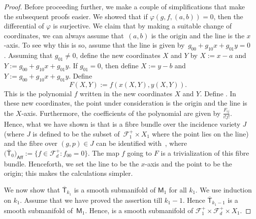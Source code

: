 \documentclass[pdftex]{sigma}
\numberwithin{equation}{section}
\begin{document}
\begin{proof}
Before proceeding further, we make a couple of simplifications that make the
subsequent proofs easier.
We showed that if $\varphi(g, f, (a, b)) = 0$, then the
differential of $\varphi$ is surjective. We claim that by making a suitable change of
coordinates, we can always assume that~$(a,b)$ is the origin and the line is the $x$-axis.
To see why this is so,
assume that the line is given by~${g_{00} + g_{10}x + g_{01}y = 0}$.
Assuming that $g_{01}\neq 0$, define the new coordinates $X$
and $Y$ by $X := x-a$ and $Y := g_{00} + g_{10}x + g_{01}y$.
If $g_{01} =0$, then define $X:= y-b$ and $Y:= g_{00} + g_{10}x + g_{01}y$.
Define
\[F(X,Y):= f(x(X,Y), y(X,Y)).\]
This is the polynomial $f$
written in the new coordinates $X$ and $Y$. Define
.
In these new coordinates, the point under consideration is the origin
and the line is the $X$-axis. Furthermore, the coefficients of the polynomial
are given by $\frac{F_{ij}}{i!j!}$.
Hence, what we have shown is that
 is a fibre bundle over the incidence variety
$J$ (where $J$ is defined to be the subset of~${\mathcal{F}_1^{+}\times X_1}$ where the point lies on the line)
and the fibre over $(g, p) \in J$ can be identified with~, where
$\big(\overline{\mathsf{T}}_0\big)_{\mathsf{Aff}} := \{ f \in \mathcal{F}_d^+\colon f_{00}=0 \}$.
The map $f$ going to $F$ is a trivialization of this fibre bundle.
Henceforth, we set the line to be the $x$-axis and the point to be the origin; this makes the
calculations simpler.

We now show that $\overline{\mathsf{T}}_{k_1}$ is a smooth
submanifold of $\mathsf{M}_1$ for all $k_1$. We use induction on $k_1$.
Assume that we have proved the assertion till $k_1-1$. Hence
$\overline{\mathsf{T}}_{k_1-1}$ is a smooth
submanifold of~$\mathsf{M}_1$. Hence,
 is a smooth submanifold of
$\mathcal{F}_1^{+} \times \mathcal{F}_d^{+} \times X_1$.


\end{proof}
\end{document}
